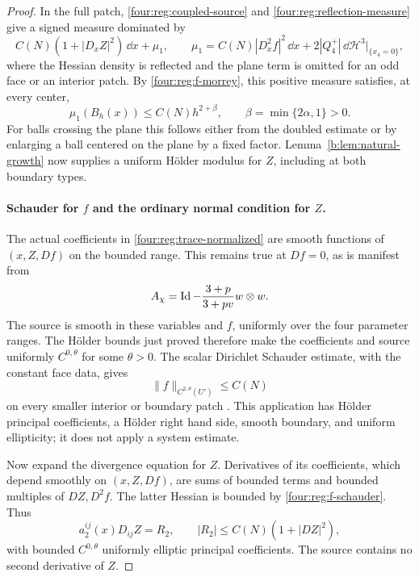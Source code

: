 \begin{proof}
In the full patch, \eqref{four:reg:coupled-source} and
\eqref{four:reg:reflection-measure} give a signed measure dominated by
\[
 C(N)(1+|D_xZ|^2)\,\dd x+\mu_1,\qquad
 \mu_1=C(N)|D_x^2f|^2\,\dd x
               +2|Q_4^+|\,\dd\mathcal H^3|_{\{x_4=0\}},
\]
where the Hessian density is reflected and the plane term is
omitted for an odd face or an interior patch.  By
\eqref{four:reg:f-morrey}, this positive measure satisfies, at every
center,
\[
 \mu_1(B_h(x))\le C(N)h^{2+\beta},\qquad
                   \beta=\min\{2\alpha,1\}>0.
\]
For balls crossing the plane this follows either from the doubled
estimate or by enlarging a ball centered on the plane by a fixed
factor.  Lemma~\ref{b:lem:natural-growth} now supplies a uniform
H\"older modulus for $Z$, including at both boundary types.

\paragraph{Schauder for $f$ and the ordinary normal condition for $Z$.}
The actual coefficients in \eqref{four:reg:trace-normalized} are smooth
functions of $(x,Z,Df)$ on the bounded range.  This remains true
at $Df=0$, as is manifest from
\[
 A_\chi=\operatorname{Id}-\frac{3+p}{3+pv}w\otimes w.
\]
The source is smooth in these variables and $f$, uniformly over
the four parameter ranges.  The H\"older bounds just proved
therefore make the coefficients and source uniformly
$C^{0,\theta}$ for some $\theta>0$.  The scalar Dirichlet Schauder
estimate, with the constant face data, gives
\begin{equation}\label{four:reg:f-schauder}
 \|f\|_{C^{2,\theta}(U')}\le C(N)
\end{equation}
on every smaller interior or boundary patch \cite{GilbargTrudinger2001}.
This application has H\"older principal coefficients, a H\"older
right hand side, smooth boundary, and uniform ellipticity; it
does not apply a system estimate.

Now expand the divergence equation for $Z$.  Derivatives of its
coefficients, which depend smoothly on $(x,Z,Df)$, are sums of
bounded terms and bounded multiples of $DZ,D^2f$.  The latter
Hessian is bounded by \eqref{four:reg:f-schauder}.  Thus
\begin{equation}\label{four:reg:Z-nondivergence}
 a_2^{ij}(x)D_{ij}Z=R_2,\qquad
 |R_2|\le C(N)(1+|DZ|^2),
\end{equation}
with bounded $C^{0,\theta}$ uniformly elliptic principal
coefficients.  The source contains no second derivative of $Z$.


\end{proof}
